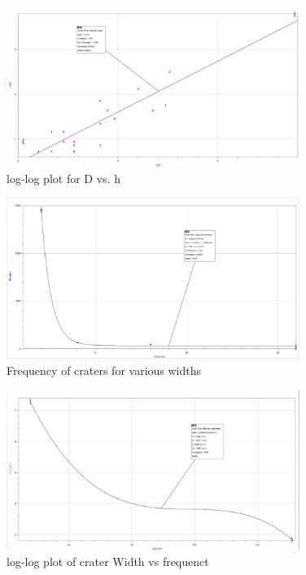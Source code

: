 \documentclass{article}
\begin{document}
\begin{figure}[H]
\centering
\includegraphics[width=0.85\textwidth]{2.png}
\caption{log-log plot for D vs. h}
\end{figure}

\begin{figure}[H]
    \centering
    \includegraphics[width=0.85\textwidth]{4.png}
    \caption{Frequency of craters for various widths}
    \label{fig:3}
\end{figure}

\begin{figure}[H]
    \centering
    \includegraphics[width=0.85\textwidth]{3.png}
    \caption{log-log plot of crater Width vs frequenct}
    \label{fig:4}
\end{figure}
\end{document}
